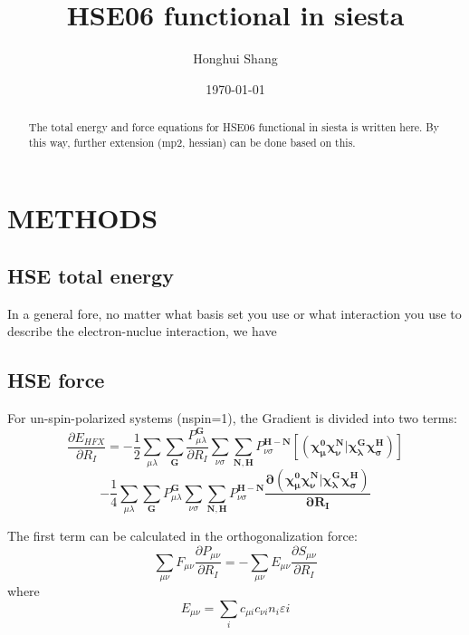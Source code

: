 \documentclass[aps,preprint,12pt]{revtex4-1}
\begin{document}
\title{HSE06 functional in siesta}
\author{ Honghui Shang}


\date{\today}

\begin{abstract}
The total energy and force equations for HSE06 functional in siesta is written here. By this way, further extension (mp2, hessian) can be done
based on this. 
\end{abstract}
\maketitle


\section{METHODS}
\subsection{HSE total energy}
In a general fore, no matter what basis set you use or what interaction you use to 
describe the electron-nuclue interaction, we have 




\subsection{HSE force}
For un-spin-polarized systems (nspin=1), the Gradient is divided into two terms:
\begin{equation}
 \dfrac{\partial{E_{HFX}}}{\partial{R_{I}}}
=-\frac{1}{2}\sum_{\mu\lambda}\sum_{\mathbf{G}}\dfrac{P_{\mu\lambda}^{\mathbf{G}}}{\partial{R_{I}}}\sum_{\nu\sigma}\sum_{\mathbf{N,H}}P_{\nu\sigma}^\mathbf{H-N}\mathbf{[(\chi_{\mu}^{0}\chi_{\nu}^{N}|\chi_{\lambda}^{G}\chi_{\sigma}^{H})]}
\end{equation}
\[
 -\frac{1}{4}\sum_{\mu\lambda}\sum_{\mathbf{G}}P_{\mu\lambda}^{\mathbf{G}}\sum_{\nu\sigma}\sum_{\mathbf{N,H}}P_{\nu\sigma}^\mathbf{H-N}\mathbf{ \dfrac{\partial{(\chi_{\mu}^{0}\chi_{\nu}^{N}|\chi_{\lambda}^{G}\chi_{\sigma}^{H})}}{\partial{R_{I}}} }
\]


The first term can be calculated in the orthogonalization force:
\begin{equation}
 \sum_{\mu\nu}{F_{\mu\nu}\dfrac{\partial{P_{\mu\nu}}}{\partial{R_{I}}}}=
-\sum_{\mu\nu}{E_{\mu\nu}\dfrac{\partial{S_{\mu\nu}}}{\partial{R_{I}}}}
\end{equation}
where
\[
 E_{\mu\nu}=\sum_{i}{c_{\mu i}c_{\nu i}n_i\varepsilon{i} }
\]
\end{document}
